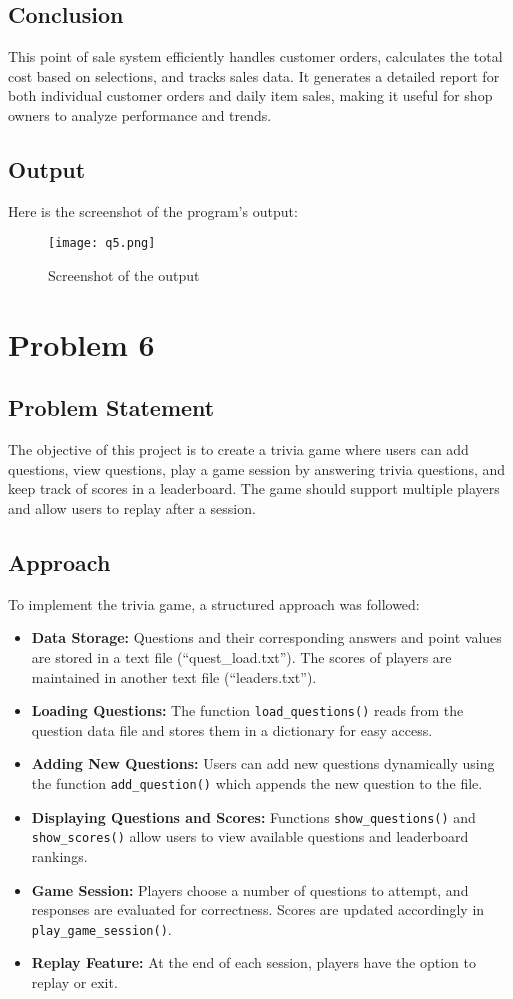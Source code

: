 \documentclass{article}
\begin{document}
\subsection{Conclusion}
This point of sale system efficiently handles customer orders, calculates the total cost based on selections, and tracks sales data. It generates a detailed report for both individual customer orders and daily item sales, making it useful for shop owners to analyze performance and trends.
\subsection{Output}
Here is the screenshot of the program's output:
\begin{figure}[h!]
    \centering
    \texttt{[image: q5.png]} 
    \caption{Screenshot of the output}
\end{figure}
\section{Problem 6}
\subsection{Problem Statement}
The objective of this project is to create a trivia game where users can add questions, view questions, play a game session by answering trivia questions, and keep track of scores in a leaderboard. The game should support multiple players and allow users to replay after a session.

\subsection{Approach}
To implement the trivia game, a structured approach was followed:

\begin{itemize}
    \item \textbf{Data Storage:} Questions and their corresponding answers and point values are stored in a text file (``quest\_load.txt''). The scores of players are maintained in another text file (``leaders.txt'').
    \item \textbf{Loading Questions:} The function \texttt{load\_questions()} reads from the question data file and stores them in a dictionary for easy access.
    \item \textbf{Adding New Questions:} Users can add new questions dynamically using the function \texttt{add\_question()} which appends the new question to the file.
    \item \textbf{Displaying Questions and Scores:} Functions \texttt{show\_questions()} and \texttt{show\_scores()} allow users to view available questions and leaderboard rankings.
    \item \textbf{Game Session:} Players choose a number of questions to attempt, and responses are evaluated for correctness. Scores are updated accordingly in \texttt{play\_game\_session()}.
    \item \textbf{Replay Feature:} At the end of each session, players have the option to replay or exit.
\end{itemize}
\end{document}
